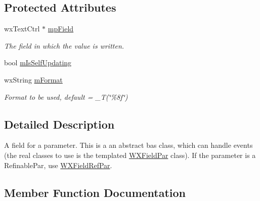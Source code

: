 \subsection*{Protected Attributes}
\begin{DoxyCompactItemize}
\item 
\mbox{\label{class_obj_cryst_1_1_w_x_field_par_base_adf1902af28299a952220fa257e7cb296}} 
wx\+Text\+Ctrl $\ast$ \mbox{\hyperlink{class_obj_cryst_1_1_w_x_field_par_base_adf1902af28299a952220fa257e7cb296}{mp\+Field}}
\begin{DoxyCompactList}\small\item\em The field in which the value is written. \end{DoxyCompactList}\item 
bool \mbox{\hyperlink{class_obj_cryst_1_1_w_x_field_par_base_a07aea47e860f14581b698ab91c7ac3f0}{m\+Is\+Self\+Updating}}
\item 
\mbox{\label{class_obj_cryst_1_1_w_x_field_par_base_aa2fad972045faa5c4fa460e6115ff1cc}} 
wx\+String \mbox{\hyperlink{class_obj_cryst_1_1_w_x_field_par_base_aa2fad972045faa5c4fa460e6115ff1cc}{m\+Format}}
\begin{DoxyCompactList}\small\item\em Format to be used, default = \+\_\+T(\char`\"{}\%8f\char`\"{}) \end{DoxyCompactList}\end{DoxyCompactItemize}


\subsection{Detailed Description}
A field for a parameter. This is a an abstract bas class, which can handle events (the real classes to use is the templated \mbox{\hyperlink{class_obj_cryst_1_1_w_x_field_par}{W\+X\+Field\+Par}} class). If the parameter is a Refinable\+Par, use \mbox{\hyperlink{class_obj_cryst_1_1_w_x_field_ref_par}{W\+X\+Field\+Ref\+Par}}. 

\subsection{Member Function Documentation}
\mbox{\label{class_obj_cryst_1_1_w_x_field_par_base_a5c7c59452cada97c926f53b294a06e27}} 
